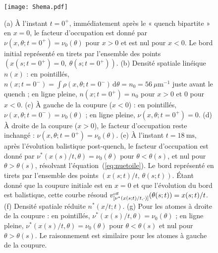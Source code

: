 \begin{figure}[H]
	\centering
	\texttt{[image: Shema.pdf]}
	\label{fig:BiPart.coupure1}
	\caption{
(a) À l'instant $t = 0^+$, immédiatement après le « quench bipartite » en $x = 0$, le facteur d'occupation est donné par $\nu(x, \theta ; t = 0^+) = \nu_0(\theta)$ pour $x > 0$ et est nul pour $x < 0$. Le bord initial représenté en tirets par l'ensemble des points $(x(s; t = 0^+) = 0,\ \theta(s; t = 0^+))$.
(b) Densité spatiale linéique $n(x)$ : en pointillés, $n(x; t = 0^-) = \int \rho(x, \theta; t = 0^-) \, \mathrm{d}\theta = n_0 = 56~\mu\mathrm{m}^{-1}$ juste avant le quench ; en ligne pleine, $n(x; t = 0^+) = n_0$ pour $x > 0$ et $0$ pour $x < 0$.
(c) À gauche de la coupure ($x < 0$) : en pointillés, $\nu(x, \theta ; t = 0^-) = \nu_0(\theta)$ ; en ligne pleine, $\nu(x, \theta ; t = 0^+) = 0$.
(d) À droite de la coupure ($x > 0$), le facteur d'occupation reste inchangé : $\nu(x, \theta ; t = 0^+) = \nu_0(\theta)$.
(e) À l'instant $t = 18~\mathrm{ms}$, après l'évolution balistique post-quench, le facteur d'occupation est donné par $\nu^\ast(x(s)/t, \theta) = \nu_0(\theta)$ pour $\theta < \theta(s)$, et nul pour $\theta > \theta(s)$, résolvant l'équation~(\ref{eq:nuetoile}). Le bord représenté en tirets par l'ensemble des points $(x(s; t)/t,\, \theta(s; t))$. Étant donné que la coupure initiale est en $x = 0$ et que l’évolution du bord est balistique, cette courbe résoud $v^{\mbox{\tiny eff}}_{[\nu^\ast(x(s; t)/t, \cdot) ]}(\theta(s; t)) = x(s; t)/t$.
(f) Densité spatiale réduite $n^\ast(x/t; t)$.
(g) Pour les atomes à droite de la coupure : en pointillés, $\nu^\ast(x(s)/t, \theta) = \nu_0(\theta)$ ; en ligne pleine, $\nu^\ast(x(s)/t, \theta) = \nu_0(\theta)$ pour $\theta < \theta(s)$ et nul pour $\theta > \theta(s)$. Le raisonnement est similaire pour les atomes à gauche de la coupure.
}
	
\end{figure}


